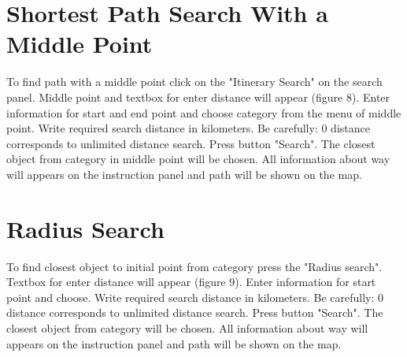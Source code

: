\section{Shortest Path Search With a Middle Point}
	To find path with a middle point click on the "Itinerary Search" on the search panel. Middle point and textbox for enter distance will appear (figure 8). Enter information for start and end point and choose category from the menu of middle point. Write required search distance in kilometers. Be carefully:  0 distance corresponds to unlimited distance search. Press button "Search". The closest object from category in middle point will be chosen. All information about way will appears on the instruction panel and path will be shown on the map.
	
\section{Radius Search}
	To find closest object to initial point from category press the "Radius search". Textbox for enter distance will appear (figure 9). Enter information for start point and choose. Write required search distance in kilometers. Be carefully:  0 distance corresponds to unlimited distance search. Press button "Search". The closest object from category will be chosen. All information about way will appears on the instruction panel and path will be shown on the map.
	